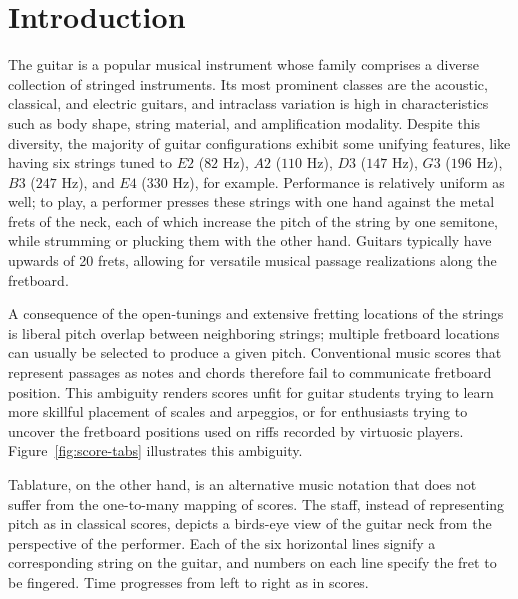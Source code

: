 \documentclass[12pt]{cmuthesis}
\begin{document}
\chapter{Introduction} 
The guitar is a popular musical instrument whose family comprises a diverse collection of stringed instruments. Its most prominent classes are the acoustic, classical, and electric guitars, and intraclass variation is high in characteristics such as body shape, string material, and amplification modality. Despite this diversity, the majority of guitar configurations exhibit some unifying features, like having six strings tuned to $E2$ ($82$ Hz), $A2$ ($110$ Hz), $D3$ ($147$ Hz), $G3$ ($196$ Hz), $B3$ ($247$ Hz), and $E4$ ($330$ Hz), for example. Performance is relatively uniform as well; to play, a performer presses these strings with one hand against the metal frets of the neck, each of which increase the pitch of the string by one semitone, while strumming or plucking them with the other hand. Guitars typically have upwards of 20 frets, allowing for versatile musical passage realizations along the fretboard.

A consequence of the open-tunings and extensive fretting locations of the strings is liberal pitch overlap between neighboring strings; multiple fretboard locations can usually be selected to produce a given pitch. Conventional music scores that represent passages as notes and chords therefore fail to communicate fretboard position. This ambiguity renders scores unfit for guitar students trying to learn more skillful placement of scales and arpeggios, or for enthusiasts trying to uncover the fretboard positions used on riffs recorded by virtuosic players. Figure~\ref{fig:score-tabs} illustrates this ambiguity.

Tablature, on the other hand, is an alternative music notation that does not suffer from the one-to-many mapping of scores. The staff, instead of representing pitch as in classical scores, depicts a birds-eye view of the guitar neck from the perspective of the performer. Each of the six horizontal lines signify a corresponding string on the guitar, and numbers on each line specify the fret to be fingered. Time progresses from left to right as in scores. 
\end{document}
